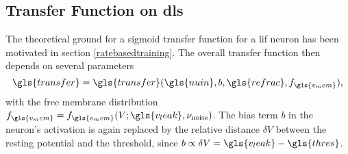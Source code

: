 \subsection{Transfer Function on \gls{dls}}
%
%		

The theoretical ground for a sigmoid transfer function for a \gls{lif} neuron has been motivated in section \cref{ratebasedtraining}. The overall transfer function then depends on several parameters
\begin{equation}
\gls{transfer} = \gls{transfer}(\gls{nuin}, b, \gls{refrac}, f_{\gls{v_mem}}),
\end{equation}
with the free membrane distribution $f_{\gls{v_mem}} = f_{\gls{v_mem}}(V; \gls{v_leak}, \nu_\text{noise})$. 
The bias term $b$ in the neuron's activation is again replaced by the relative distance $\delta V$ between the resting potential and the threshold, since $b \propto \delta V = \gls{v_leak} - \gls{thres}$. 

